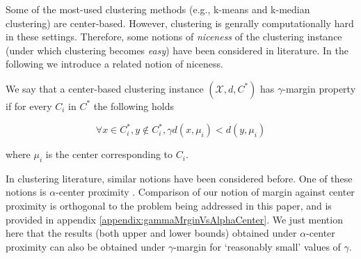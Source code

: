 \documentclass[orivec]{llncs}
\newcommand{\mc}{\mathcal}
\begin{document}
Some of the most-used clustering methods (e.g., k-means and k-median clustering) are center-based. However, clustering is genrally computationally hard in these settings. Therefore, some notions of \emph{niceness} of the clustering instance (under which clustering becomes \emph{easy}) have been considered in literature. In the following we introduce a related notion of niceness.

\begin{definition}
\label{defn:alphacp}
We say that a center-based clustering instance $(\mc X, d, C^*)$ has $\gamma$-margin property if for every $C_i$ in $C^*$ the following holds

$$\forall x\in C^*_i, y \notin C^*_i, \gamma d(x, \mu_i) < d(y, \mu_i)$$

where $\mu_i$ is the center corresponding to $C_i$.

\end{definition}




In clustering literature, similar notions have been considered before. One of these notions is $\alpha$-center proximity \cite{balcan2012clustering,awasthi2012center}. Comparison of our notion of margin against center proximity is orthogonal to the problem being addressed in this paper, and is provided in appendix \ref{appendix:gammaMrginVsAlphaCenter}. We just mention here that the results (both upper and lower bounds) obtained under $\alpha$-center proximity can also be obtained under $\gamma$-margin for `reasonably small' values of $\gamma$.
 
\end{document}
